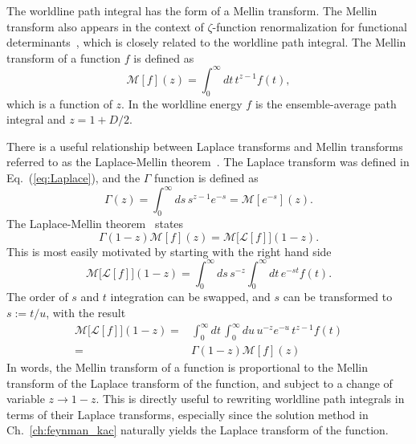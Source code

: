 The worldline path integral has the form of a Mellin transform.  
The Mellin transform also appears in the context of $\zeta$-function renormalization for functional determinants~\cite{Elizalde2008},
which is closely related to the worldline path integral.  
The Mellin transform of a function $f$ is defined as 
\begin{equation}
\mathcal{M}[f](z)= \int_0^\infty dt\, t^{z-1}f(t),
\end{equation}
which is a function of $z$.  
In the worldline energy $f$ is the ensemble-average path integral and $z=1+D/2$.

There is a useful relationship between Laplace transforms and Mellin transforms referred to as the Laplace-Mellin theorem~\cite{Lew1975}.  
The Laplace transform was defined in Eq.~(\ref{eq:Laplace}), and the $\Gamma$ function is defined as  
\begin{equation}
\Gamma(z) = \int_0^\infty ds\, s^{z-1} e^{-s} = \mathcal{M}[e^{-s}](z).
\end{equation}
The Laplace-Mellin theorem~\cite{Lew1975} states
\begin{equation}
  \Gamma(1-z)\mathcal{M}[f](z) = \mathcal{M}\big[\mathcal{L}[f]\big](1-z)\label{eq:Laplace-Mellin}.
\end{equation}
This is most easily motivated by starting with the right hand side
\begin{equation}
\mathcal{M}\big[\mathcal{L}[f]\big](1-z) = 
\int_0^\infty ds\, s^{-z} \int_0^\infty dt\,e^{-st} f(t).
\end{equation}
The order of $s$ and $t$ integration can be swapped, and $s$ can be transformed to $s:=t/u$, with the 
result
\begin{align}
\mathcal{M}\big[\mathcal{L}[f]\big](1-z)=&\int_0^\infty dt\,\int_0^\infty du\, u^{-z} e^{-u}\,t^{z-1} f(t) \\
=& \Gamma(1-z)\mathcal{M}[f](z)
\end{align}
In words, the Mellin transform of a function is proportional to the Mellin transform of the Laplace transform of the function,
 and subject to a change of variable $z\rightarrow 1-z$.  This is 
directly useful to rewriting worldline path integrals in terms of their Laplace transforms, especially
since the solution method in Ch.~\ref{ch:feynman_kac} naturally yields the Laplace transform of the function.


